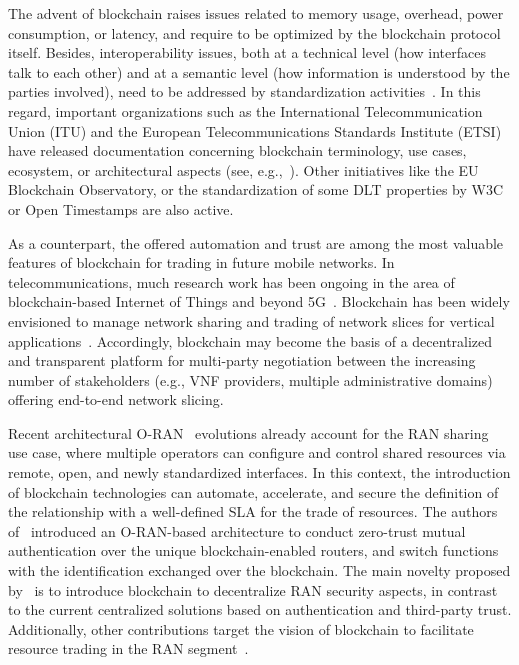 \documentclass[journal]{IEEEtran}
\begin{document}
	The advent of blockchain raises issues related to memory usage, overhead, power consumption, or latency, and require to be optimized by the blockchain protocol itself. Besides, interoperability issues, both at a technical level (how interfaces talk to each other) and at a semantic level (how information is understood by the parties involved), need to be addressed by standardization activities~\cite{konig2020comparing}. In this regard, important organizations such as the International Telecommunication Union (ITU) and the European Telecommunications Standards Institute (ETSI) have released documentation concerning blockchain terminology, use cases, ecosystem, or architectural aspects (see, e.g.,~\cite{ITU1400,etsi2020permissioned}). Other initiatives like the EU Blockchain Observatory, or the standardization of some DLT properties by W3C or Open Timestamps are also active.
	
	As a counterpart, the offered automation and trust are among the most valuable features of blockchain for trading in future mobile networks. In telecommunications, much research work has been ongoing in the area of blockchain-based Internet of Things and beyond 5G~\cite{nguyen2020blockchain}. Blockchain has been widely envisioned to manage network sharing and trading of network slices for vertical applications~\cite{xu2020blockchain}. Accordingly, blockchain may become the basis of a decentralized and transparent platform for multi-party negotiation between the increasing number of stakeholders (e.g., VNF providers, multiple administrative domains) offering end-to-end network slicing. 
	
	Recent architectural O-RAN~\cite{ORANall} evolutions already account for the RAN sharing use case, where multiple operators can configure and control shared resources via remote, open, and newly standardized interfaces. In this context, the introduction of blockchain technologies can automate, accelerate, and secure the definition of the relationship with a well-defined SLA for the trade of resources. The authors of~\cite{xu2021ran} introduced an O-RAN-based architecture to conduct zero-trust mutual authentication over the unique blockchain-enabled routers, and switch functions with the identification exchanged over the blockchain. The main novelty proposed by~\cite{xu2021ran} is to introduce blockchain to decentralize RAN security aspects, in contrast to the current centralized solutions based on authentication and third-party trust. Additionally, other contributions target the vision of blockchain to facilitate resource trading in the RAN segment~\cite{maksymyuk2020blockchain, togou2020dbns}.
	
\end{document}
